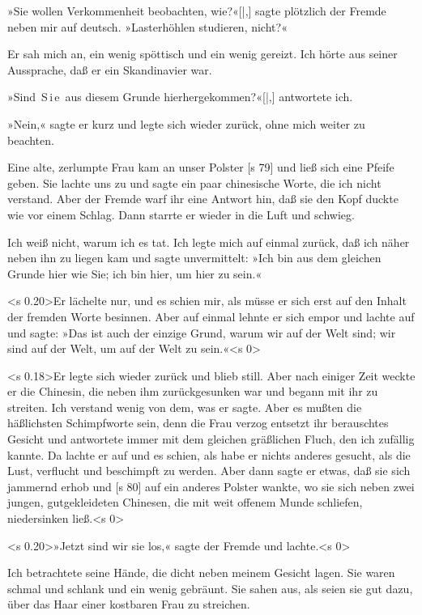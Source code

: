 »Sie wollen Verkommenheit beobachten, wie?«[|,]
sagte plötzlich der Fremde neben mir auf deutsch.
»Lasterhöhlen studieren, nicht?«

Er sah mich an, ein wenig spöttisch und ein
wenig gereizt. Ich hörte aus seiner Aussprache, daß
er ein Skandinavier war.

»Sind  S i e  aus diesem Grunde hierhergekommen?«[|,]
antwortete ich.

»Nein,« sagte er kurz und legte sich wieder
zurück, ohne mich weiter zu beachten.

Eine alte, zerlumpte Frau kam an unser Polster
[s 79]
und ließ sich eine Pfeife geben. Sie lachte uns zu
und sagte ein paar chinesische Worte, die ich nicht
verstand. Aber der Fremde warf ihr eine Antwort
hin, daß sie den Kopf duckte wie vor einem Schlag.
Dann starrte er wieder in die Luft und schwieg.

Ich weiß nicht, warum ich es tat. Ich legte mich
auf einmal zurück, daß ich näher neben ihn zu liegen
kam und sagte unvermittelt: »Ich bin aus dem gleichen
Grunde hier wie Sie; ich bin hier, um hier zu sein.«

<s 0.20>Er lächelte nur, und es schien mir, als müsse er
sich erst auf den Inhalt der fremden Worte besinnen.
Aber auf einmal lehnte er sich empor und lachte auf
und sagte: »Das ist auch der einzige Grund, warum
wir auf der Welt sind; wir sind auf der Welt, um
auf der Welt zu sein.«<s 0>

<s 0.18>Er legte sich wieder zurück und blieb still. Aber
nach einiger Zeit weckte er die Chinesin, die neben
ihm zurückgesunken war und begann mit ihr zu
streiten. Ich verstand wenig von dem, was er sagte.
Aber es mußten die häßlichsten Schimpfworte sein,
denn die Frau verzog entsetzt ihr berauschtes Gesicht
und antwortete immer mit dem gleichen gräßlichen
Fluch, den ich zufällig kannte. Da lachte er auf und
es schien, als habe er nichts anderes gesucht, als die
Lust, verflucht und beschimpft zu werden. Aber dann
sagte er etwas, daß sie sich jammernd erhob und
[s 80]
auf ein anderes Polster wankte, wo sie sich neben
zwei jungen, gutgekleideten Chinesen, die mit weit
offenem Munde schliefen, niedersinken ließ.<s 0>

<s 0.20>»Jetzt sind wir sie los,« sagte der Fremde und
lachte.<s 0>

Ich betrachtete seine Hände, die dicht neben
meinem Gesicht lagen. Sie waren schmal und schlank
und ein wenig gebräunt. Sie sahen aus, als seien
sie gut dazu, über das Haar einer kostbaren Frau
zu streichen.

